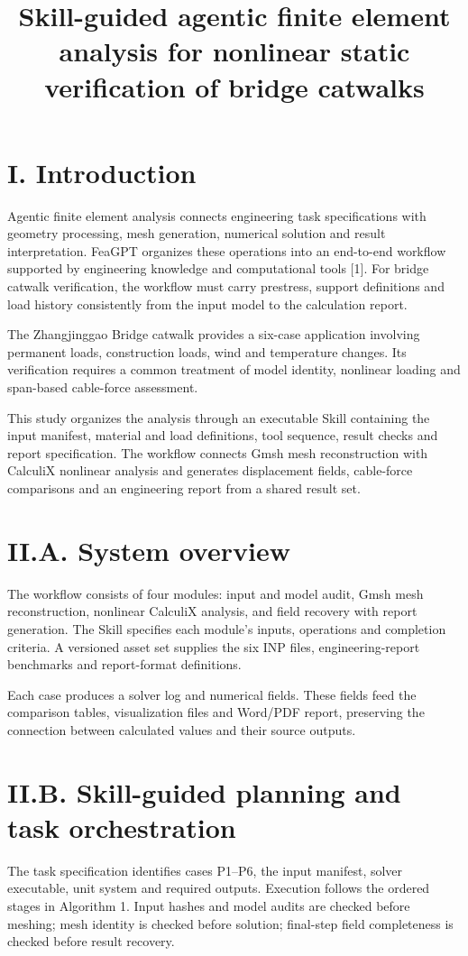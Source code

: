 \documentclass[11pt]{article}
\title{Skill-guided agentic finite element analysis for nonlinear static verification of bridge catwalks}
\date{}
\begin{document}
\maketitle
\section*{I. Introduction}
Agentic finite element analysis connects engineering task specifications with geometry processing, mesh generation, numerical solution and result interpretation. FeaGPT organizes these operations into an end-to-end workflow supported by engineering knowledge and computational tools [1]. For bridge catwalk verification, the workflow must carry prestress, support definitions and load history consistently from the input model to the calculation report.

The Zhangjinggao Bridge catwalk provides a six-case application involving permanent loads, construction loads, wind and temperature changes. Its verification requires a common treatment of model identity, nonlinear loading and span-based cable-force assessment.

This study organizes the analysis through an executable Skill containing the input manifest, material and load definitions, tool sequence, result checks and report specification. The workflow connects Gmsh mesh reconstruction with CalculiX nonlinear analysis and generates displacement fields, cable-force comparisons and an engineering report from a shared result set.

\section*{II.A. System overview}
The workflow consists of four modules: input and model audit, Gmsh mesh reconstruction, nonlinear CalculiX analysis, and field recovery with report generation. The Skill specifies each module’s inputs, operations and completion criteria. A versioned asset set supplies the six INP files, engineering-report benchmarks and report-format definitions.

Each case produces a solver log and numerical fields. These fields feed the comparison tables, visualization files and Word/PDF report, preserving the connection between calculated values and their source outputs.

\section*{II.B. Skill-guided planning and task orchestration}
The task specification identifies cases P1–P6, the input manifest, solver executable, unit system and required outputs. Execution follows the ordered stages in Algorithm 1. Input hashes and model audits are checked before meshing; mesh identity is checked before solution; final-step field completeness is checked before result recovery.
\end{document}
